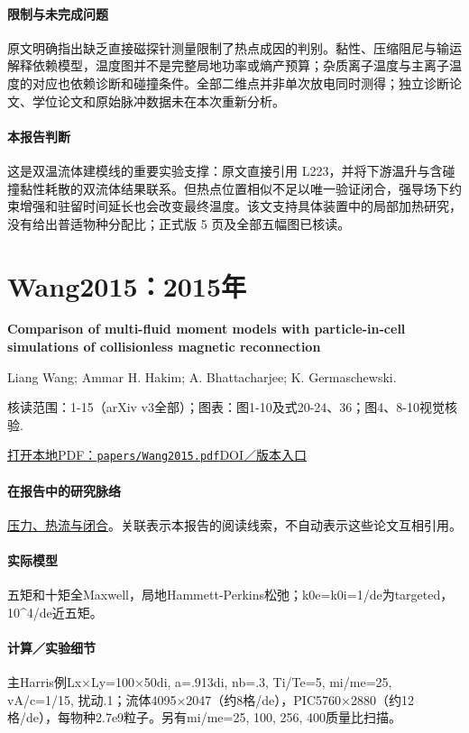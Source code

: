 \documentclass[UTF8,a4paper,11pt,openany,fontset=fandol]{ctexbook}
\begin{document}
\paragraph{限制与未完成问题}原文明确指出缺乏直接磁探针测量限制了热点成因的判别。黏性、压缩阻尼与输运解释依赖模型，温度图并不是完整局地功率或熵产预算；杂质离子温度与主离子温度的对应也依赖诊断和碰撞条件。全部二维点并非单次放电同时测得；独立诊断论文、学位论文和原始脉冲数据未在本次重新分析。

\paragraph{本报告判断}这是双温流体建模线的重要实验支撑：原文直接引用 L223，并将下游温升与含碰撞黏性耗散的双流体结果联系。但热点位置相似不足以唯一验证闭合，强导场下约束增强和驻留时间延长也会改变最终温度。该文支持具体装置中的局部加热研究，没有给出普适物种分配比；正式版 5 页及全部五幅图已核读。

\section{Wang2015：2015年}\label{paper:Wang2015}

\textbf{Comparison of multi-fluid moment models with particle-in-cell simulations of collisionless magnetic reconnection}\citep{Wang2015}\

Liang Wang;  Ammar H. Hakim;  A. Bhattacharjee;  K. Germaschewski.

\textsf{核读范围：}1-15（arXiv v3全部）；\textsf{图表：}图1-10及式20-24、36；图4、8-10视觉核验.

\href{run:../papers/Wang2015.pdf}{打开本地PDF：\texttt{papers/Wang2015.pdf}}\quad\href{https://doi.org/10.1063/1.4906063}{DOI／版本入口}

\paragraph{在报告中的研究脉络}\hyperref[story:closure]{压力、热流与闭合}。关联表示本报告的阅读线索，不自动表示这些论文互相引用。

\paragraph{实际模型}五矩和十矩全Maxwell，局地Hammett-Perkins松弛；k0e=k0i=1/de为targeted，10\textasciicircum{}4/de近五矩。

\paragraph{计算／实验细节}主Harris例Lx×Ly=100×50di, a=.913di, nb=.3, Ti/Te=5, mi/me=25, vA/c=1/15, 扰动.1；流体4095×2047（约8格/de），PIC5760×2880（约12格/de），每物种2.7e9粒子。另有mi/me=25, 100, 256, 400质量比扫描。
\end{document}
